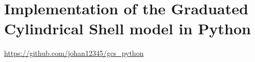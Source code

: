\chapter{Implementation of the Graduated Cylindrical Shell model in Python}
\label{chp:GCS_Python}

\url{https://github.com/johan12345/gcs_python}